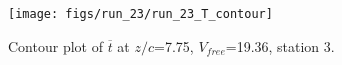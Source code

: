 \begin{figure}[H]
\centering
\texttt{[image: figs/run\_23/run\_23\_T\_contour]}
\caption{Contour plot of $\overline{t}$ at $z/c$=7.75, $V_{free}$=19.36, station 3.}
\label{fig:run_23_T_contour}
\end{figure}


